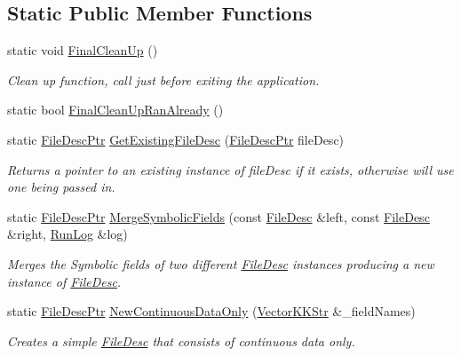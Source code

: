 \subsection*{Static Public Member Functions}
\begin{DoxyCompactItemize}
\item 
static void \hyperlink{class_k_k_m_l_l_1_1_file_desc_a9fd3ff4c390edd86f36488c5d1f0128b}{Final\+Clean\+Up} ()
\begin{DoxyCompactList}\small\item\em Clean up function, call just before exiting the application. \end{DoxyCompactList}\item 
static bool \hyperlink{class_k_k_m_l_l_1_1_file_desc_a1ca628d0fbf5b96c92a037012ce776d3}{Final\+Clean\+Up\+Ran\+Already} ()
\item 
static \hyperlink{class_k_k_m_l_l_1_1_file_desc_a58f5730f6f51a4844a729377ada1971b}{File\+Desc\+Ptr} \hyperlink{class_k_k_m_l_l_1_1_file_desc_ab64013b479502d2761a9f11570a565bc}{Get\+Existing\+File\+Desc} (\hyperlink{class_k_k_m_l_l_1_1_file_desc_a58f5730f6f51a4844a729377ada1971b}{File\+Desc\+Ptr} file\+Desc)
\begin{DoxyCompactList}\small\item\em Returns a pointer to an existing instance of \textquotesingle{}file\+Desc\textquotesingle{} if it exists, otherwise will use one being passed in. \end{DoxyCompactList}\item 
static \hyperlink{class_k_k_m_l_l_1_1_file_desc_a58f5730f6f51a4844a729377ada1971b}{File\+Desc\+Ptr} \hyperlink{class_k_k_m_l_l_1_1_file_desc_ab52bc452abe63a4f649c0138978c7118}{Merge\+Symbolic\+Fields} (const \hyperlink{class_k_k_m_l_l_1_1_file_desc}{File\+Desc} \&left, const \hyperlink{class_k_k_m_l_l_1_1_file_desc}{File\+Desc} \&right, \hyperlink{class_k_k_b_1_1_run_log}{Run\+Log} \&log)
\begin{DoxyCompactList}\small\item\em Merges the Symbolic fields of two different \textquotesingle{}\hyperlink{class_k_k_m_l_l_1_1_file_desc}{File\+Desc}\textquotesingle{} instances producing a new instance of \textquotesingle{}\hyperlink{class_k_k_m_l_l_1_1_file_desc}{File\+Desc}\textquotesingle{}. \end{DoxyCompactList}\item 
static \hyperlink{class_k_k_m_l_l_1_1_file_desc_a58f5730f6f51a4844a729377ada1971b}{File\+Desc\+Ptr} \hyperlink{class_k_k_m_l_l_1_1_file_desc_a743571b092e55a4d5d15531804ccedb9}{New\+Continuous\+Data\+Only} (\hyperlink{class_k_k_b_1_1_vector_k_k_str}{Vector\+K\+K\+Str} \&\+\_\+field\+Names)
\begin{DoxyCompactList}\small\item\em Creates a simple \hyperlink{class_k_k_m_l_l_1_1_file_desc}{File\+Desc} that consists of continuous data only. \end{DoxyCompactList}\end{DoxyCompactItemize}
